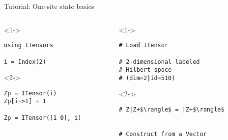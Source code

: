 \begin{frame}[fragile]{Tutorial: One-site state basics}

\begin{columns}

\begin{column}{4.5cm}

\begin{onlyenv}<1->

\begin{lstlisting}[language=JuliaLocal, style=julia, basicstyle=\small]
using ITensors

i = Index(2)

 \end{lstlisting}

\end{onlyenv}

\begin{onlyenv}<2->

\begin{lstlisting}[language=JuliaLocal, style=julia, basicstyle=\small]
Zp = ITensor(i)
Zp[i=>1] = 1

Zp = ITensor([1 0], i)
\end{lstlisting}

\end{onlyenv}

\end{column}

\begin{column}{4.5cm}

\begin{onlyenv}<1->

\begin{lstlisting}[style=julia, numbers=none, mathescape, basicstyle=\small]
# Load ITensor

# 2-dimensional labeled
# Hilbert space
# (dim=2|id=510)
\end{lstlisting}

\end{onlyenv}

\begin{onlyenv}<2->

\begin{lstlisting}[style=julia, numbers=none, mathescape, basicstyle=\small]
# Z|Z+$\rangle$ = |Z+$\rangle$


# Construct from a Vector
\end{lstlisting}

\end{onlyenv}

\end{column}

\end{columns}

\end{frame}
